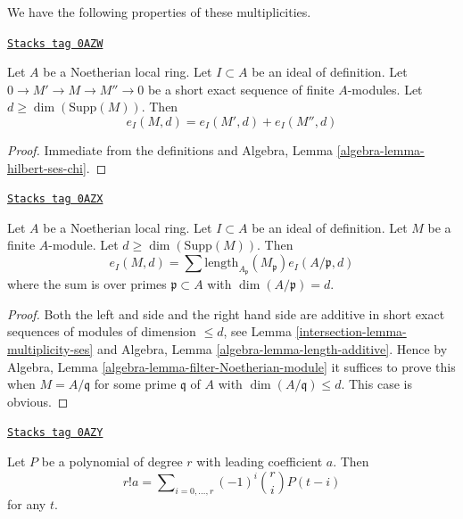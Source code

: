 We have the following properties of these multiplicities.

\begin{lemma}
\label{intersection-lemma-multiplicity-ses}
\href{https://stacks.math.columbia.edu/tag/0AZW}{\texttt{Stacks tag 0AZW}}

Let $A$ be a Noetherian local ring. Let $I \subset A$ be an ideal of
definition. Let $0 \to M' \to M \to M'' \to 0$ be a short exact sequence
of finite $A$-modules. Let $d \geq \dim(\text{Supp}(M))$. Then
$$
e_I(M, d) = e_I(M', d) + e_I(M'', d)
$$
\end{lemma}

\begin{proof}
Immediate from the definitions and
Algebra, Lemma \ref{algebra-lemma-hilbert-ses-chi}.
\end{proof}

\begin{lemma}
\label{intersection-lemma-multiplicity-as-a-sum}
\href{https://stacks.math.columbia.edu/tag/0AZX}{\texttt{Stacks tag 0AZX}}

Let $A$ be a Noetherian local ring. Let $I \subset A$ be an ideal of
definition. Let $M$ be a finite $A$-module. Let $d \geq \dim(\text{Supp}(M))$.
Then
$$
e_I(M, d) =
\sum \text{length}_{A_\mathfrak p}(M_\mathfrak p) e_I(A/\mathfrak p, d)
$$
where the sum is over primes $\mathfrak p \subset A$ with
$\dim(A/\mathfrak p) = d$.
\end{lemma}

\begin{proof}

Both the left and side and the right hand side are additive in short
exact sequences of modules of dimension $\leq d$, see
Lemma \ref{intersection-lemma-multiplicity-ses} and
Algebra, Lemma \ref{algebra-lemma-length-additive}.
Hence by Algebra, Lemma \ref{algebra-lemma-filter-Noetherian-module}
it suffices to prove this when $M = A/\mathfrak q$ for some
prime $\mathfrak q$ of $A$ with $\dim(A/\mathfrak q) \leq d$.
This case is obvious.
\end{proof}

\begin{lemma}
\label{intersection-lemma-leading-coefficient}
\href{https://stacks.math.columbia.edu/tag/0AZY}{\texttt{Stacks tag 0AZY}}

Let $P$ be a polynomial of degree $r$ with leading coefficient $a$.
Then
$$
r! a = \sum\nolimits_{i = 0, \ldots, r} (-1)^i{r \choose i} P(t - i)
$$
for any $t$.
\end{lemma}

